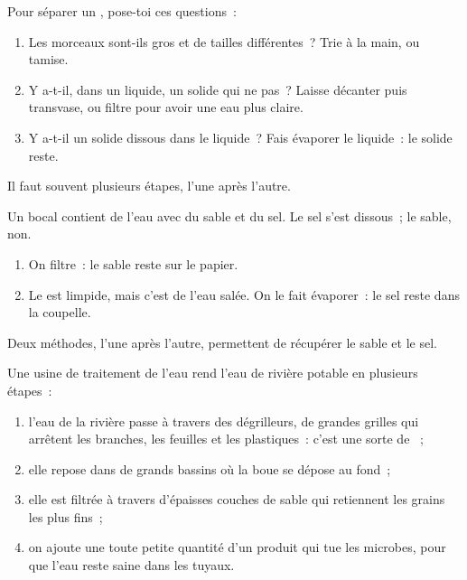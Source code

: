 \begin{method}\label{met:g3:separating-mixtures:choose}
Pour séparer un , pose-toi ces questions~:
\begin{enumerate}
  \item Les morceaux sont-ils gros et de tailles différentes~? Trie à la
        main, ou tamise.
  \item Y a-t-il, dans un liquide, un solide qui ne  pas~?
        Laisse décanter puis transvase, ou filtre pour avoir une eau plus
        claire.
  \item Y a-t-il un solide dissous dans le liquide~? Fais évaporer le
        liquide~: le solide reste.
\end{enumerate}
Il faut souvent plusieurs étapes, l'une après l'autre.
\end{method}

\begin{example}\label{ex:g3:separating-mixtures:three}
Un bocal contient de l'eau avec du sable et du sel. Le sel s'est
dissous~; le sable, non.
\begin{enumerate}
  \item On filtre~: le sable reste sur le papier.
  \item Le  est limpide, mais c'est de l'eau salée. On le fait
        évaporer~: le sel reste dans la coupelle.
\end{enumerate}
Deux méthodes, l'une après l'autre, permettent de récupérer le sable et
le sel.
\end{example}

\begin{example}\label{ex:g3:separating-mixtures:plant}
Une usine de traitement de l'eau rend l'eau de rivière potable en
plusieurs étapes~:
\begin{enumerate}
  \item l'eau de la rivière passe à travers des dégrilleurs, de grandes
        grilles qui arrêtent les branches, les feuilles et les
        plastiques~: c'est une sorte de ~;
  \item elle repose dans de grands bassins où la boue se dépose au
        fond~;
  \item elle est filtrée à travers d'épaisses couches de sable qui
        retiennent les grains les plus fins~;
  \item on ajoute une toute petite quantité d'un produit qui tue les
        microbes, pour que l'eau reste saine dans les tuyaux.
\end{enumerate}
\end{example}


